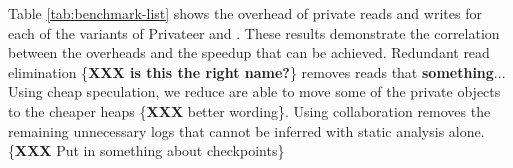 Table \ref{tab:benchmark-list} shows the overhead of private reads and
writes for each of the variants of Privateer and \namensp. These results
demonstrate the correlation between the overheads and the speedup that can
be achieved. Redundant read elimination \{\textbf{XXX is this the right
  name?}\} removes reads that \textbf{something}... Using cheap
  speculation, we reduce are able to move some of the private objects to
  the cheaper heaps \{\textbf{XXX} better wording\}. Using collaboration
  removes the remaining unnecessary logs that cannot be inferred with
  static analysis alone.
\{\textbf{XXX} Put in something about checkpoints\}

